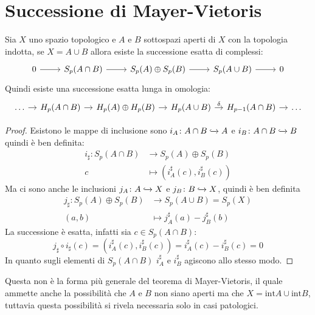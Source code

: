 \section{Successione di Mayer-Vietoris}

\begin{theorem}
  Sia $ X $ uno spazio topologico e $ A $ e $ B $ sottospazi aperti di $ X $ con la
  topologia indotta, se $ X = A \cup B $ allora esiste la successione esatta di complessi:
  \[
    \begin{tikzcd}
      0 \rar & S_p(A \cap B) \rar & S_p(A) \oplus S_p(B) \rar & S_p(A \cup B) \rar & 0
    \end{tikzcd}
  \]
  Quindi esiste una successione esatta lunga in omologia:
  \[
    \begin{tikzcd}[nodes = {column sep = 10 pt}]
      \dots \rar & H_p(A \cap B) \rar & H_p(A) \oplus H_p(B) \rar & H_p(A \cup B) \rar{\delta} & H_{p-1}(A \cap B) \rar & \dots
    \end{tikzcd}
  \]
\end{theorem}
\begin{proof}
  Esistono le mappe di inclusione sono $ i_A \colon A \cap B \xhookrightarrow{} A $ e $ i_B \colon A \cap B \xhookrightarrow{} B $ quindi
  è ben definita:
  \begin{align*}
    i_\sharp \colon S_p(A \cap B) & \to S_p(A) \oplus S_p(B) \\
    c & \mapsto (i_A^\sharp (c), i_B^\sharp (c))
  \end{align*}
  Ma ci sono anche le inclusioni $ j_A \colon A \xhookrightarrow{} X $ e $ j_B \colon B \xhookrightarrow{} X $,
  quindi è ben definita
  \begin{align*}
    j_\sharp \colon  S_p(A) \oplus S_p(B) & \to S_p(A \cup B) = S_p(X) \\
    (a,b) &  \mapsto j_A^\sharp(a) - j_B^\sharp(b)
  \end{align*}
  La successione è esatta, infatti sia $ c \in S_p(A \cap B) $:
  \[
    j_\sharp \circ i_\sharp (c) = (i_A^\sharp (c), i_B^\sharp (c)) = i_A^\sharp (c) -  i_B^\sharp (c) = 0
  \]
  In quanto sugli elementi di $ S_p(A \cap B) $ $ i_A^\sharp $ e $ i_B^\sharp $ agiscono
  allo stesso modo.
\end{proof}

\begin{osservation}
  Questa non è la forma più generale del teorema di Mayer-Vietoris, il quale
  ammette anche la possibilità che $ A $ e $ B $ non siano aperti ma che
  $ X = \mathrm{int} A \cup \mathrm{int} B $, tuttavia questa possibilità si rivela
  necessaria solo in casi patologici.
\end{osservation}

